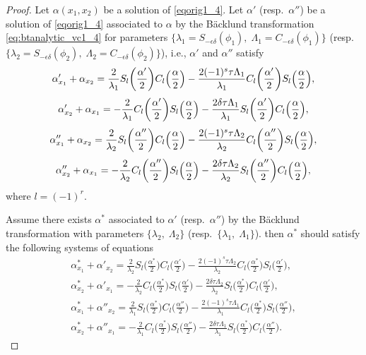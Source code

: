 \documentclass[10pt,a4paper]{amsart}
\numberwithin{equation}{section}
\begin{document}
\begin{proof}
Let $\alpha(x_1,x_2)$ be a solution of \eqref{eqorig1_4}. Let $\alpha'$ (resp.\ $\alpha''$) be a solution of \eqref{eqorig1_4} associated to $\alpha$ by the B\"acklund transformation \eqref{eq:btanalytic_vc1_4}
for parameters $\{\lambda_1=S_{-\epsilon\delta}(\phi_1),\; \Lambda_1=C_{-\epsilon\delta}(\phi_1)\}$ (resp.\ $\{\lambda_2=S_{-\epsilon\delta}(\phi_2),\; \Lambda_2=C_{-\epsilon\delta}(\phi_2)\}$), i.e., $\alpha'$ and $\alpha''$ satisfy
\begin{gather}
\alpha'_{x_1}+\alpha_{x_2}=\frac{2}{\lambda_1}S_{l}\biggl(\frac{\alpha'}{2}\biggr)C_{l}\Bigl(\frac{\alpha}{2}\Bigr)-\frac{2(-1)^s\tau\Lambda_1}{\lambda_1} C_{l}\biggl(\frac{\alpha'}{2}\biggr)S_{l}\Bigl(\frac{\alpha}{2}\Bigr),\nonumber\\[1mm]
\alpha'_{x_2}+\alpha_{x_1}=-\frac{2}{\lambda_1}C_{l}\biggl(\frac{\alpha'}{2}\biggr)S_{l}\Bigl(\frac{\alpha}{2}\Bigr)-\frac{2\delta\tau\Lambda_1}{\lambda_1} S_{l}\biggl(\frac{\alpha'}{2}\biggr)C_{l}\Bigl(\frac{\alpha}{2}\Bigr),\label{eq:btanalytic_v1}
\\[1mm]
\alpha''_{x_1}+\alpha_{x_2}=\frac{2}{\lambda_2}S_{l}\biggl(\frac{\alpha''}{2}\biggr)C_{l}\Bigl(\frac{\alpha}{2}\Bigr) -\frac{2(-1)^s\tau\Lambda_2}{\lambda_2}C_{l}\biggl(\frac{\alpha''}{2}\biggr)S_{l}\Bigl(\frac{\alpha}{2}\Bigr),\nonumber\\[1mm]
\alpha''_{x_2}+\alpha_{x_1}=-\frac{2}{\lambda_2}C_{l}\biggl(\frac{\alpha''}
{2 }\biggr)S_{l}\Bigl(\frac{\alpha}{2}\Bigr)-\frac{2\delta\tau\Lambda_2}{\lambda_2} S_{l}\biggl(\frac{\alpha''}{2}\biggr)C_{l}\Bigl(\frac{\alpha}{2}\Bigr),\label{eq:btanalytic_v2}
\end{gather}
 where $ l=(-1)^r$.

Assume there exists $\alpha^*$ associated to $\alpha'$ (resp.\ $\alpha''$) by the B\"acklund transformation with parameters
 $\{\lambda_2,\; \Lambda_2\}$ (resp.\ $\{\lambda_1,\; \Lambda_1\}$). then $\alpha^*$ should satisfy the following systems of equations
\begin{gather}
\alpha^{*}_{x_1}+\alpha'_{x_2} = \frac{2}{\lambda_2}S_{l}\biggl(\frac{\alpha^{*}}{2}\biggr)C_{l}\biggl(\frac{\alpha'}{2}\biggr)-\frac{2(-1)^s\tau\Lambda_2}{\lambda_2} C_{l}\biggl(\frac{\alpha^{*}}{2}\biggr)S_{l}\biggl(\frac{\alpha'}{2}\biggr),\nonumber\\
\alpha^{*}_{x_2}+\alpha'_{x_1}=-\frac{2}{\lambda_2}C_{l}\biggl(\frac{\alpha^{*}}{2}\biggr)S_{l}\biggl(\frac{\alpha'}{2}\biggr)-\frac{2\delta\tau\Lambda_2}{\lambda_2} S_{l}\biggl(\frac{\alpha^{*}}{2}\biggr)C_{l}\biggl(\frac{\alpha'}{2}\biggr),\label{eq:btanalytic_v2*}\\
\alpha^*_{x_1}+\alpha''_{x_2}=\frac{2}{\lambda_1}S_{l}\biggl(\frac{\alpha^*}{2}\biggr)C_{l}\biggl(\frac{\alpha''}{2}\biggr)-\frac{2(-1)^s\tau\Lambda_1}{\lambda_1} C_{l}\biggl(\frac{\alpha^*}{2}\biggr)S_{l}\biggl(\frac{\alpha''}{2}\biggr),\nonumber\\
\alpha^*_{x_2}+\alpha''_{x_1}=-\frac{2}{\lambda_1}C_{l}\biggl(\frac{\alpha^*}{2}\biggr)S_{l}\biggl(\frac{\alpha''}{2}\biggr)-\frac{2\delta\tau\Lambda_1}{\lambda_1} S_{l}\biggl(\frac{\alpha^*}{2}\biggr)C_{l}\biggl(\frac{\alpha''}{2}\biggr).\label{eq:btanalytic_v1*}
\end{gather}


\end{proof}
\end{document}
